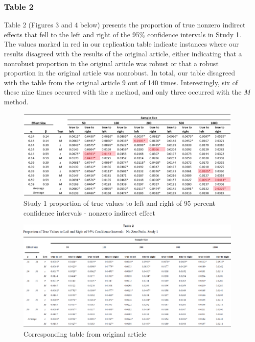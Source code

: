 \documentclass[10,a4paperpaper,]{article}
\begin{document}
\newpage

\subsubsection{Table 2}

Table 2 (Figures 3 and 4 below) presents the proportion of true nonzero
indirect effects that fell to the left and right of the 95\% confidence
intervals in Study 1. The values marked in red in our replication table
indicate instances where our results disagreed with the results of the
original article, either indicating that a nonrobust proportion in the
original article was robust or that a robust proportion in the original
article was nonrobust. In total, our table disagreed with the table from
the original article 9 out of 140 times. Interestingly, six of these
nine times occurred with the \(z\) method, and only three occurred with
the \(M\) method.

\newpage
\begin{landscape}

\begin{figure}
\includegraphics[width=1\linewidth]{RepliSimsTable2} \caption{Study 1 proportion of true values to left and right of 95 percent confidence intervals - nonzero indirect effect}\label{fig:unnamed-chunk-3}
\end{figure}

\begin{figure}
\includegraphics[width=1\linewidth]{RepliSimsMacKinnonTable2} \caption{Corresponding table from original article}\label{fig:unnamed-chunk-4}
\end{figure}

\end{landscape}
\end{document}
